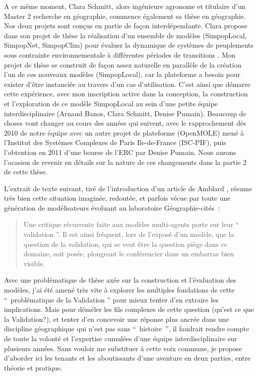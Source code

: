 A ce même moment, Clara Schmitt, alors ingénieure agronome et titulaire d'un Master 2 recherche en géographie, commence également sa thèse en géographie. Nos deux projets sont conçus en partie de façon interdépendante. Clara propose dans son projet de thèse la réalisation d'un ensemble de modèles (SimpopLocal, SimpopNet, SimpopClim) pour évaluer la dynamique de systèmes de peuplements sous contrainte environnementale à différentes périodes de transitions \autocite{Schmitt2014}⁠. ⁠Mon projet de thèse se construit de façon assez naturelle en parallèle de la création l'un de ces nouveaux modèles (SimpopLocal), car la plateforme a besoin pour exister d'être instanciée au travers d'un cas d'utilisation. C'est ainsi que démarre cette expérience, avec mon inscription active dans la conception, la construction et l'exploration de ce modèle SimpopLocal au sein d'une petite équipe interdisciplinaire (Arnaud Banos, Clara Schmitt, Denise Pumain). Beaucoup de choses vont changer au cours des années qui suivent, avec le rapprochement dès 2010 de notre équipe avec un autre projet de plateforme (OpenMOLE) mené à l'Institut des Systèmes Complexes de Paris Ile-de-France (ISC-PIF), puis l'obtention en 2011 d'une bourse de l’ERC par Denise Pumain. Nous aurons l'ocasion de revenir en détails sur la nature de ces changements dans la partie 2 de cette thèse.

L’extrait de texte suivant, tiré de l'introduction d'un article de Amblard \autocite{Amblard2006},⁠ résume très bien cette situation imaginée, redoutée, et parfois vécue par toute une génération de modélisateurs évoluant au laboratoire Géographie-cités : 

\blockquote[\cite{Amblard2006}]{Une critique récurrente faite aux modèles multi-agents porte sur leur \enquote{ validation }. Il est ainsi fréquent, lors de l'exposé d'un modèle, que la question de la validation, qui se veut être la question piège dans ce domaine, soit posée, plongeant le conférencier dans un embarras bien visible.}

Avec une problématique de thèse axée sur la construction et l'évaluation des modèles, j’ai été amené très vite à explorer les multiples fondations de cette \enquote{ problématique de la Validation } pour mieux tenter d'en extraire les implications. Mais pour déméler les fils complexes de cette question (qu'est ce que la Validation?), et tenter d'en concevoir une réponse plus ancrée dans une discipline géographique qui n'est pas sans \enquote{ histoire }, il faudrait rendre compte de toute la volonté et l'expertise cumulées d'une équipe interdisciplinaire sur plusieurs années. Sans vouloir me substituer à cette voix commune, je propose d'aborder ici les tenants et les aboutissants d'une aventure en deux parties, entre théorie et pratique.

